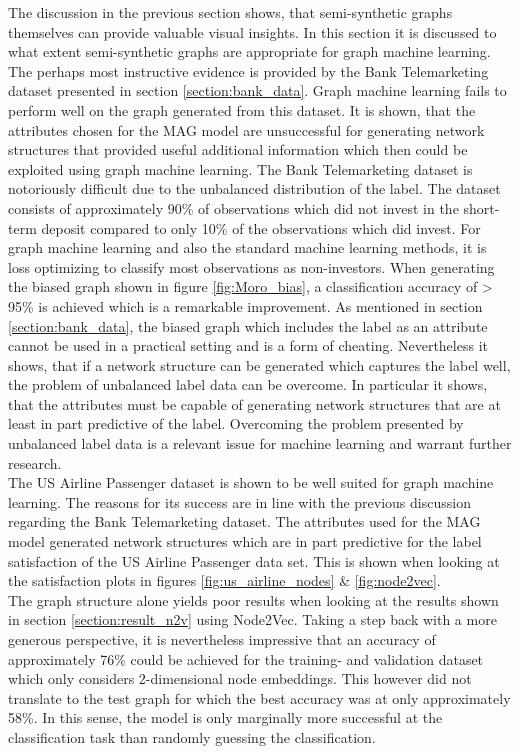   The discussion in the previous section shows, that semi-synthetic graphs
  themselves can provide valuable visual insights. In this section it is
  discussed to what extent semi-synthetic graphs are appropriate for graph
  machine learning. The perhaps most instructive evidence is provided by the Bank
  Telemarketing dataset presented in section \ref{section:bank_data}. Graph
  machine learning fails to perform well on the graph generated from this
  dataset. It is shown, that the attributes chosen for the MAG model are
  unsuccessful for generating network structures that provided useful additional
  information which then could be exploited using graph machine learning. The 
  Bank Telemarketing dataset is notoriously difficult due to the unbalanced
  distribution of the label. The dataset consists of approximately 90\% of
  observations which did not invest in the short-term deposit compared to only 
  10\% of the observations which did invest. For graph machine learning and
  also the standard machine learning methods, it is loss optimizing to
  classify most observations as non-investors. When generating the biased graph 
  shown in figure \ref{fig:Moro_bias}, a classification accuracy of > 95\% is 
  achieved which is a remarkable improvement. As mentioned in section 
  \ref{section:bank_data}, the biased graph which includes the label as an 
  attribute cannot be used in a practical setting and is a form of
  cheating. Nevertheless it shows, that if a network structure can be generated
  which captures the label well, the problem of unbalanced label data can be
  overcome. In particular it shows, that the attributes must be capable of
  generating network structures that are at least in part predictive of the
  label. Overcoming the problem presented by unbalanced label data is a relevant 
  issue for machine learning and warrant further research. \\

  \noindent The US Airline Passenger dataset is shown to be well suited for 
  graph machine learning. The reasons for its success are in line with the 
  previous discussion regarding the Bank Telemarketing dataset. The attributes 
  used for the MAG model generated network structures which are in part 
  predictive for the label satisfaction of the US Airline Passenger data set. 
  This is shown when looking at the satisfaction plots in figures 
  \ref{fig:us_airline_nodes} \& \ref{fig:node2vec}. \\ 

  \noindent The graph structure alone yields poor results when looking at the 
  results shown in section \ref{section:result_n2v} using Node2Vec. Taking a 
  step back with a more generous perspective, it is nevertheless impressive that 
  an accuracy of approximately 76\% could be achieved for the training- and 
  validation dataset which only considers 2-dimensional node embeddings. This 
  however did not translate to the test graph for which the best accuracy was at 
  only approximately 58\%. In this sense, the model is only marginally more 
  successful at the classification task than randomly guessing the 
  classification. \\

